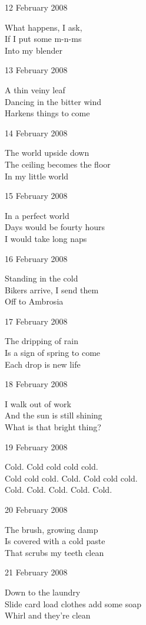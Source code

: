 \documentclass[12pt]{article}
\begin{document}
12 February 2008

What happens, I ask, \\
If I put some m-n-ms  \\
Into my blender

13 February 2008

A thin veiny leaf \\
Dancing in the bitter wind \\
Harkens things to come

14 February 2008

The world upside down \\
The ceiling becomes the floor \\
In my little world


15 February 2008

In a perfect world \\
Days would be fourty hours \\
I would take long naps

\newpage

16 February 2008

Standing in the cold \\
Bikers arrive, I send them \\
Off to Ambrosia

17 February 2008

The dripping of rain \\
Is a sign of spring to come \\
Each drop is new life

18 February 2008

I walk out of work \\
And the sun is still shining \\
What is that bright thing?

19 February 2008

Cold. Cold cold cold cold. \\
Cold cold cold. Cold. Cold cold cold. \\
Cold. Cold. Cold. Cold. Cold.

20 February 2008

The brush, growing damp \\
Is covered with a cold paste \\
That scrubs my teeth clean

21 February 2008

Down to the laundry \\
Slide card load clothes add some soap \\
Whirl and they're clean
\end{document}

